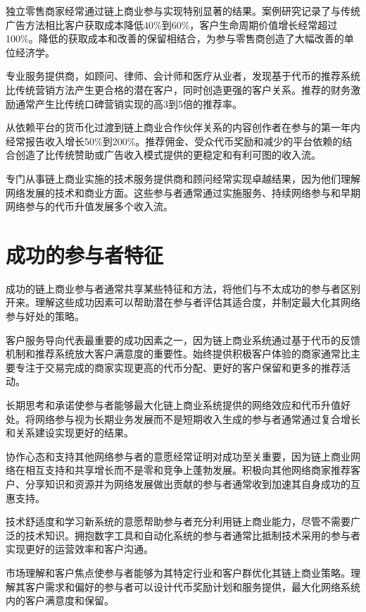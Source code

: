 \documentclass[
  Letterpaper,
]{scrbook}
\begin{document}
独立零售商家经常通过链上商业参与实现特别显著的结果。案例研究记录了与传统广告方法相比客户获取成本降低40\%到60\%，客户生命周期价值增长经常超过100\%。降低的获取成本和改善的保留相结合，为参与零售商创造了大幅改善的单位经济学。

专业服务提供商，如顾问、律师、会计师和医疗从业者，发现基于代币的推荐系统比传统营销方法产生更合格的潜在客户，同时创造更强的客户关系。推荐的财务激励通常产生比传统口碑营销实现的高3到5倍的推荐率。

从依赖平台的货币化过渡到链上商业合作伙伴关系的内容创作者在参与的第一年内经常报告收入增长50\%到200\%。推荐佣金、受众代币奖励和减少的平台依赖的结合创造了比传统赞助或广告收入模式提供的更稳定和有利可图的收入流。

专门从事链上商业实施的技术服务提供商和顾问经常实现卓越结果，因为他们理解网络发展的技术和商业方面。这些参与者通常通过实施服务、持续网络参与和早期网络参与的代币升值发展多个收入流。

\section{成功的参与者特征}\label{ux6210ux529fux7684ux53c2ux4e0eux8005ux7279ux5f81}

成功的链上商业参与者通常共享某些特征和方法，将他们与不太成功的参与者区别开来。理解这些成功因素可以帮助潜在参与者评估其适合度，并制定最大化其网络参与好处的策略。

客户服务导向代表最重要的成功因素之一，因为链上商业系统通过基于代币的反馈机制和推荐系统放大客户满意度的重要性。始终提供积极客户体验的商家通常比主要专注于交易完成的商家实现更高的代币分配、更好的客户保留和更多的推荐活动。

长期思考和承诺使参与者能够最大化链上商业系统提供的网络效应和代币升值好处。将网络参与视为长期业务发展而不是短期收入生成的参与者通常通过复合增长和关系建设实现更好的结果。

协作心态和支持其他网络参与者的意愿经常证明对成功至关重要，因为链上商业网络在相互支持和共享增长而不是零和竞争上蓬勃发展。积极向其他网络商家推荐客户、分享知识和资源并为网络发展做出贡献的参与者通常收到加速其自身成功的互惠支持。

技术舒适度和学习新系统的意愿帮助参与者充分利用链上商业能力，尽管不需要广泛的技术知识。拥抱数字工具和自动化系统的参与者通常比抵制技术采用的参与者实现更好的运营效率和客户沟通。

市场理解和客户焦点使参与者能够为其特定行业和客户群优化其链上商业策略。理解其客户需求和偏好的参与者可以设计代币奖励计划和服务提供，最大化网络系统内的客户满意度和保留。
\end{document}
